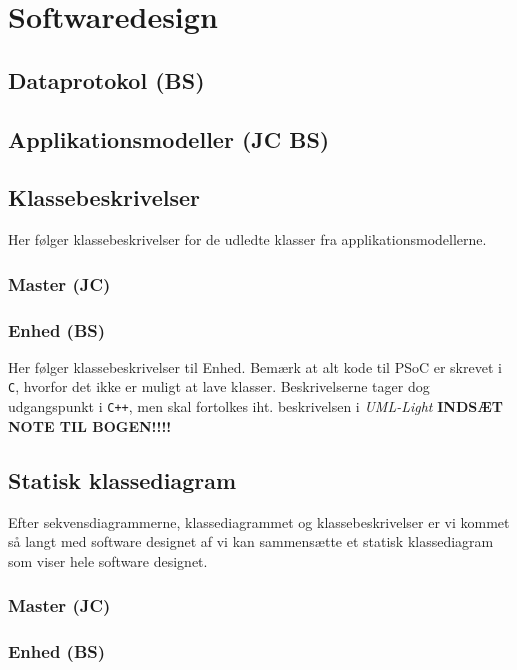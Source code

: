 \chapter{Softwaredesign}

\section{Dataprotokol (BS)}


\section{Applikationsmodeller (JC BS)}


\section{Klassebeskrivelser}
Her følger klassebeskrivelser for de udledte klasser fra applikationsmodellerne.

\subsection{Master (JC)}






\subsection{Enhed (BS)}
Her følger klassebeskrivelser til Enhed. 
Bemærk at alt kode til PSoC er skrevet i \verb+C+, hvorfor det ikke er muligt at lave klasser. Beskrivelserne tager dog udgangspunkt i \verb-C++-, men skal fortolkes iht. beskrivelsen i \textit{UML-Light} \textbf{INDSÆT NOTE TIL BOGEN!!!!}









\clearpage

\section{Statisk klassediagram}
Efter sekvensdiagrammerne, klassediagrammet og klassebeskrivelser er vi kommet så langt med software designet af vi kan sammensætte et statisk klassediagram som viser hele software designet.

\subsection{Master (JC)}


\clearpage

\subsection{Enhed (BS)}



\clearpage


